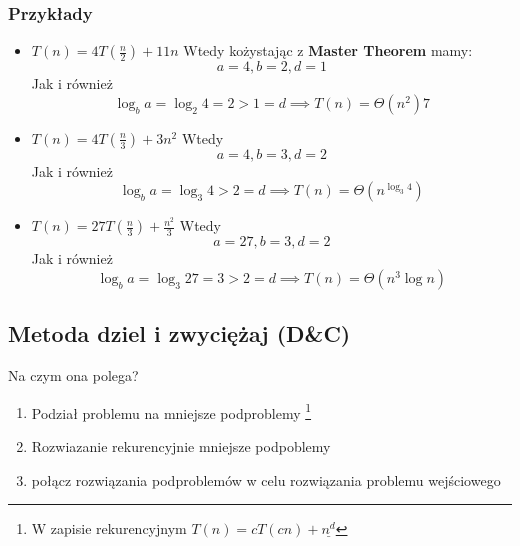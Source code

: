 \documentclass[11pt,a4paper]{article}
\begin{document}
\subsubsection*{Przykłady}
\begin{itemize}
    \item $T(n) = 4T(\frac{n}{2}) + 11n$ \newline
        Wtedy kożystając z \textbf{Master Theorem} mamy:
        \[
            a = 4, b = 2, d = 1
        \]
        Jak i również
        \[
            \log_b a = \log_2 4 = 2 > 1 = d \implies T(n) = \Theta(n^2)7
        \]
    \item $T(n) = 4T(\frac{n}{3}) + 3n^2$ \newline
        Wtedy
        \[
            a = 4, b = 3, d = 2
        \]
        Jak i również
        \[
            \log_b a = \log_3 4 > 2 = d \implies T(n) = \Theta(n^{\log_3 4})
        \]
    \item $T(n) = 27T(\frac{n}{3}) + \frac{n^2}{3}$ \newline
        Wtedy
        \[
            a = 27, b = 3, d = 2
        \]
        Jak i również
        \[
            \log_b a = \log_3 27 = 3 > 2 = d \implies T(n) = \Theta(n^3\log n)
        \]
\end{itemize}

\subsection{Metoda dziel i zwyciężaj (D\&C)}
Na czym ona polega?
\begin{enumerate}
    \item Podział problemu na mniejsze podproblemy \footnote{W zapisie rekurencyjnym $T(n) = cT(cn) + \underline{n^d}$}
    \item Rozwiazanie rekurencyjnie mniejsze podpoblemy
    \item połącz rozwiązania podproblemów w celu rozwiązania problemu wejściowego
\end{enumerate}
\end{document}
